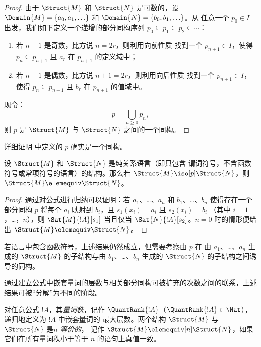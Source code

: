 \documentclass[../../../include/open-logic-section]{subfiles}
\begin{document}
\begin{proof}
  由于 $\Struct{M}$ 和 $\Struct{N}$ 是可数的，设 $\Domain{M} =
  \{a_0, a_1, \ldots \}$ 和 $\Domain{N} = \{b_0, b_1, \ldots \}$。从
  任意一个 $p_0 \in I$ 出发，我们如下定义一个递增的部分同构序列 $p_0 \subseteq p_1 \subseteq p_2
  \subseteq \cdots$：
  \begin{enumerate}
  \item 若 $n+1$ 是奇数，比方说 $n = 2r$，则利用向前性质
    找到一个 $p_{n+1} \in I$，使得 $p_n \subseteq p_{n+1}$
    且 $a_r$ 在 $p_{n+1}$ 的定义域中；
  \item 若 $n+1$ 是偶数，比方说 $n+1 = 2r$，则利用向后性质
    找到一个 $p_{n+1} \in I$，使得 $p_n \subseteq p_{n+1}$
    且 $b_r$ 在 $p_{n+1}$ 的值域中。
  \end{enumerate}
  现令：
  \[
p = \bigcup_{n\ge 0} p_n,
\]
  则 $p$ 是 $\Struct{M}$ 与 $\Struct{N}$ 之间的一个同构。
\end{proof}

\begin{prob}
  详细证明  中定义的 $p$ 确实是一个同构。
\end{prob}

\begin{thm}
  设 $\Struct{M}$ 和 $\Struct{N}$ 是纯关系语言（即只包含
  谓词符号，不含函数符号或常项符号的语言）的结构。那么若
  $\Struct{M} \iso[p] \Struct{N}$，则 $\Struct{M} \elemequiv
  \Struct{N}$。
\end{thm}

\begin{proof}
  通过对公式进行归纳可以证明：若 $a_1$、\dots、$a_n$ 和
  $b_1$、\dots、$b_n$ 使得存在一个部分同构 $p$
  将每个 $a_i$ 映射到 $b_i$，且 $s_1(x_i) =a_i$ 且 $s_2(x_i) =b_i$
  （其中 $i = 1$，\dots，$n$），则 $\Sat{M}{!A}[s_1]$ 当且仅当
  $\Sat{N}{!A}[s_2]$。$n=0$ 时的情形便给出 $\Struct{M} \elemequiv \Struct{N}$。
\end{proof}

\begin{rem}
若语言中包含函数符号，上述结果仍然成立，但需要考察由 $p$ 在
由 $a_1$、\dots、$a_n$ 生成的 $\Struct{M}$ 的子结构与由 $b_1$、\dots、$b_n$ 生成的 $\Struct{N}$ 的子结构之间诱导的同构。
\end{rem}

通过建立公式中嵌套量词的层数与相关部分同构可被扩充的次数之间的联系，上述结果可被“分解”为不同的阶段。

\begin{defn}
  对任意公式 $!A$，其\emph{量词秩}，记作
  $\QuantRank{!A}$（$\QuantRank{!A} \in \Nat$），递归地定义为 $!A$ 中嵌套量词的
  最大层数。两个结构 $\Struct{M}$ 与 $\Struct{N}$ 是\emph{$n$-等价的}，
  记作 $\Struct{M} \elemequiv[n] \Struct{N}$，如果它们在所有量词秩小于等于 $n$ 的语句上真值一致。
\end{defn}
\end{document}
